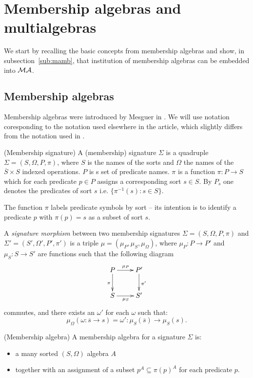 \documentclass[10pt]{article}
\begin{document}
\section{Membership algebras and multialgebras}\label{se:member}
We start by recalling the basic concepts from membership algebras and show,
in subsection~\ref{sub:mamb}, that institution of membership algebras can be
embedded into ${\mathcal{MA}}$.
%
\subsection{Membership algebras}
Membership algebras were introduced by Mesguer in \cite{member}. We will use
notation coresponding to the notation used elsewhere in the article, which slightly differs
from the notation used in \cite{member}.

\begin{definition} (Membership signature)
A (membership) signature $\Sigma$ is a quadruple $\Sigma=(S,\Omega,P,\pi)$, where $S$ is
the names of the sorts and $\Omega$ the names of the $\overline{S} \times
S$ indexed operations. $P$ is s set of predicate names. $\pi$ is a function
$\pi:P \to S$ which for each predicate $p \in P$ assigns a corresponding sort
$s \in S$. By $P_s$ one denotes the predicates of sort $s$
i.e. $\{\pi^{-1}(s): s\in S\}$.
\end{definition}
%
The function $\pi$ labels predicate symbols by sort -- its intention is to
identify a predicate $p$ with $\pi(p)=s$ as a subset of sort $s$.

\begin{definition}
A {\it signature morphism} between two membership signatures $\Sigma =
(S,\Omega,P,\pi)$ and $\Sigma' = (S',\Omega',P',\pi')$ is a triple $\mu =
(\mu_P,\mu_S,\mu_{\Omega})$, where $\mu_P: P \to P'$ and $\mu_S: S \to S'$
are functions such that the following diagram
\[ \xymatrix{
   P \ar[d]_{\pi} \ar[r]^{\mu_P} & P' \ar[d]^{\pi'}	\\
   S \ar[r]_{\mu_S} & S'	}
\]
commutes, and there exists an $\omega'$ for each $\omega$ such that:
\[ \mu_{\Omega}(\omega: \overline{s} \to s) = \omega': \mu_S(\overline{s}) \to \mu_S(s) .\]
\end{definition}

\begin{definition} (Membership algebra)
A membership algebra for a signature $\Sigma$ is:
\begin{itemize} 
\item a many sorted $(S,\Omega)$ algebra $A$
\item together with an assignment of a subset $ p^A \subseteq {\pi(p)}^A$ for each predicate $p$.
\end{itemize}
\end{definition}
\end{document}
